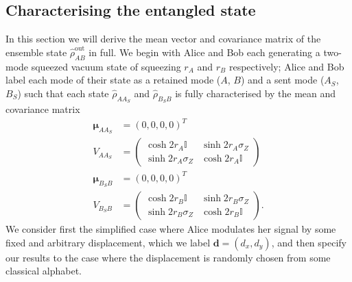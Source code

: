 \documentclass[%
 reprint,
 superscriptaddress,
 amsmath,
 amssymb,
 aps,
 pra,
]{revtex4-2}
\newcommand{\id}{\mathbb{I}}
\newcommand{\sz}{\sigma_Z}
\begin{document}
%


\FloatBarrier
\appendix
\begin{widetext}

\section{Characterising the entangled state}
\label{app:derivation}
In this section we will derive the mean vector and covariance matrix of the ensemble state $\hat \rho_{AB}^\mathrm{out}$ in full. We begin with Alice and Bob each generating a two-mode squeezed vacuum state of squeezing $r_A$ and $r_B$ respectively; Alice and Bob label each mode of their state as a retained mode ($A$, $B$) and a sent mode ($A_S$, $B_S$) such that each state $\hat \rho_{AA_S}$ and $\hat \rho_{B_SB}$ is fully characterised by the mean and covariance matrix
\begin{align}
    \bm{\mu}_{AA_S} &= (0, 0, 0, 0)^T \\
    V_{AA_S} &= \begin{pmatrix}
        \cosh 2r_A \id & \sinh 2r_A \sz \\
        \sinh 2r_A \sz & \cosh 2r_A \id
    \end{pmatrix} \\
    \bm{\mu}_{B_SB} &= (0, 0, 0, 0)^T \\
    V_{B_SB} &= \begin{pmatrix}
        \cosh 2r_B \id & \sinh 2r_B \sz \\
        \sinh 2r_B \sz & \cosh 2r_B \id
    \end{pmatrix}.
\end{align}
We consider first the simplified case where Alice modulates her signal by some fixed and arbitrary displacement, which we label $\bm{d} = (d_x, d_y)$, and then specify our results to the case where the displacement is randomly chosen from some classical alphabet.


\end{widetext}
\end{document}
